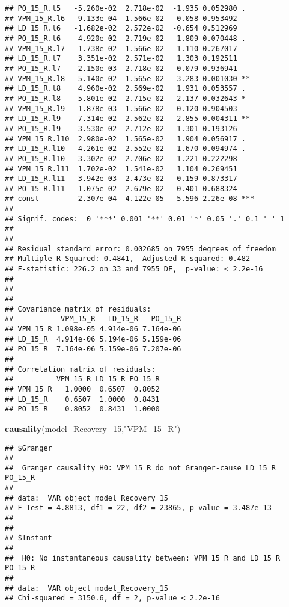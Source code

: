 \documentclass[
]{article}
\newenvironment{Shaded}{\begin{snugshade}}{\end{snugshade}}
\newcommand{\FunctionTok}[1]{\textcolor[rgb]{0.13,0.29,0.53}{\textbf{#1}}}
\newcommand{\NormalTok}[1]{#1}
\newcommand{\StringTok}[1]{\textcolor[rgb]{0.31,0.60,0.02}{#1}}
\begin{document}
\begin{verbatim}
## PO_15_R.l5   -5.260e-02  2.718e-02  -1.935 0.052980 .  
## VPM_15_R.l6  -9.133e-04  1.566e-02  -0.058 0.953492    
## LD_15_R.l6   -1.682e-02  2.572e-02  -0.654 0.512969    
## PO_15_R.l6    4.920e-02  2.719e-02   1.809 0.070448 .  
## VPM_15_R.l7   1.738e-02  1.566e-02   1.110 0.267017    
## LD_15_R.l7    3.351e-02  2.571e-02   1.303 0.192511    
## PO_15_R.l7   -2.150e-03  2.718e-02  -0.079 0.936941    
## VPM_15_R.l8   5.140e-02  1.565e-02   3.283 0.001030 ** 
## LD_15_R.l8    4.960e-02  2.569e-02   1.931 0.053557 .  
## PO_15_R.l8   -5.801e-02  2.715e-02  -2.137 0.032643 *  
## VPM_15_R.l9   1.878e-03  1.566e-02   0.120 0.904503    
## LD_15_R.l9    7.314e-02  2.562e-02   2.855 0.004311 ** 
## PO_15_R.l9   -3.530e-02  2.712e-02  -1.301 0.193126    
## VPM_15_R.l10  2.980e-02  1.565e-02   1.904 0.056917 .  
## LD_15_R.l10  -4.261e-02  2.552e-02  -1.670 0.094974 .  
## PO_15_R.l10   3.302e-02  2.706e-02   1.221 0.222298    
## VPM_15_R.l11  1.702e-02  1.541e-02   1.104 0.269451    
## LD_15_R.l11  -3.942e-03  2.473e-02  -0.159 0.873317    
## PO_15_R.l11   1.075e-02  2.679e-02   0.401 0.688324    
## const         2.307e-04  4.122e-05   5.596 2.26e-08 ***
## ---
## Signif. codes:  0 '***' 0.001 '**' 0.01 '*' 0.05 '.' 0.1 ' ' 1
## 
## 
## Residual standard error: 0.002685 on 7955 degrees of freedom
## Multiple R-Squared: 0.4841,  Adjusted R-squared: 0.482 
## F-statistic: 226.2 on 33 and 7955 DF,  p-value: < 2.2e-16 
## 
## 
## 
## Covariance matrix of residuals:
##           VPM_15_R   LD_15_R   PO_15_R
## VPM_15_R 1.098e-05 4.914e-06 7.164e-06
## LD_15_R  4.914e-06 5.194e-06 5.159e-06
## PO_15_R  7.164e-06 5.159e-06 7.207e-06
## 
## Correlation matrix of residuals:
##          VPM_15_R LD_15_R PO_15_R
## VPM_15_R   1.0000  0.6507  0.8052
## LD_15_R    0.6507  1.0000  0.8431
## PO_15_R    0.8052  0.8431  1.0000
\end{verbatim}

\begin{Shaded}
\begin{Highlighting}[]
\FunctionTok{causality}\NormalTok{(model\_Recovery\_15,}\StringTok{"VPM\_15\_R"}\NormalTok{)}
\end{Highlighting}
\end{Shaded}

\begin{verbatim}
## $Granger
## 
##  Granger causality H0: VPM_15_R do not Granger-cause LD_15_R PO_15_R
## 
## data:  VAR object model_Recovery_15
## F-Test = 4.8813, df1 = 22, df2 = 23865, p-value = 3.487e-13
## 
## 
## $Instant
## 
##  H0: No instantaneous causality between: VPM_15_R and LD_15_R PO_15_R
## 
## data:  VAR object model_Recovery_15
## Chi-squared = 3150.6, df = 2, p-value < 2.2e-16
\end{verbatim}
\end{document}
